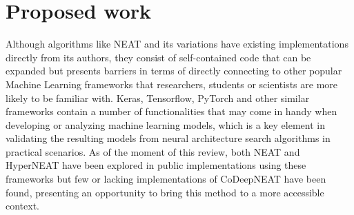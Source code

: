 \documentclass[12pt]{article}
\begin{document}
    \begin{comment}
    Sharing the same perspective of looking at layer level instead of nodes themselves, CoDeepNEAT extends DeepNEAT by dividing the construction of a topology in two different levels: modules and blueprints. The interaction between these components is described in \cite{DBLP:journals/corr/MiikkulainenLMR17}: "in CoDeepNEAT, two populations of modules and blueprints are evolved separately, using the same methods as described for DeepNEAT. The blueprint chromosome is a graph where each node contains a pointer to a particular module species. In turn, each module chromosome is a graph that represents a small DNN. During fitness evaluation, the modules and blueprints are combined together to create a larger assembled network Figure 1. Each node in the blueprint is replaced with a module chosen randomly from the species to which that node points. If multiple blueprint nodes point to the same module species, then the same module is used in all of them. The assembled networks are evaluated the a manner similar to DeepNEAT, but the fitnesses of the assembled networks are attributed back to blueprints and modules as the average fitness of all the assembled networks containing that blueprint or module. CoDeepNEAT can evolve repetitive modular structure efficiently. Furthermore, because small mutations in the modules and blueprints open lead to large changes in the assembled network structure, CoDeepNEAT can explore more diverse and deeper architectures than DeepNEAT."
    \end{comment}




\section{Proposed work}

Although algorithms like NEAT and its variations have existing implementations directly from its authors, they consist of self-contained code that can be expanded but presents barriers in terms of directly connecting to other popular Machine Learning frameworks that researchers, students or scientists are more likely to be familiar with. Keras, Tensorflow, PyTorch and other similar frameworks contain a number of functionalities that may come in handy when developing or analyzing machine learning models, which is a key element in validating the resulting models from neural architecture search algorithms in practical scenarios. As of the moment of this review, both NEAT and HyperNEAT have been explored in public implementations using these frameworks but few or lacking implementations of CoDeepNEAT have been found, presenting an opportunity to bring this method to a more accessible context.
\end{document}
